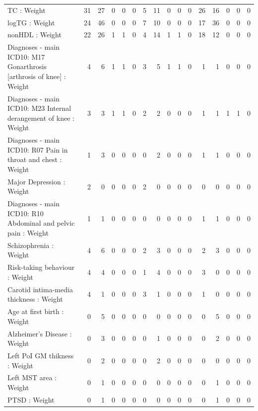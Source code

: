 \begin{table}[ht]
\begin{tabular}{lrrrrrrrrrrrrrrr}
  TC : Weight  &  31 &  27 &   0 &   0 &   0 &   5 &  11 &   0 &   0 &   0 &  26 &  16 &   0 &   0 &   0 \\ 
  logTG : Weight  &  24 &  46 &   0 &   0 &   0 &   7 &  10 &   0 &   0 &   0 &  17 &  36 &   0 &   0 &   0 \\ 
  nonHDL : Weight  &  22 &  26 &   1 &   1 &   0 &   4 &  14 &   1 &   1 &   0 &  18 &  12 &   0 &   0 &   0 \\ 
  Diagnoses - main ICD10: M17 Gonarthrosis [arthrosis of knee] : Weight  &   4 &   6 &   1 &   1 &   0 &   3 &   5 &   1 &   1 &   0 &   1 &   1 &   0 &   0 &   0 \\ 
  Diagnoses - main ICD10: M23 Internal derangement of knee : Weight  &   3 &   3 &   1 &   1 &   0 &   2 &   2 &   0 &   0 &   0 &   1 &   1 &   1 &   1 &   0 \\ 
  Diagnoses - main ICD10: R07 Pain in throat and chest : Weight  &   1 &   3 &   0 &   0 &   0 &   0 &   2 &   0 &   0 &   0 &   1 &   1 &   0 &   0 &   0 \\ 
  Major Depression : Weight  &   2 &   0 &   0 &   0 &   0 &   2 &   0 &   0 &   0 &   0 &   0 &   0 &   0 &   0 &   0 \\ 
  Diagnoses - main ICD10: R10 Abdominal and pelvic pain : Weight  &   1 &   1 &   0 &   0 &   0 &   0 &   0 &   0 &   0 &   0 &   1 &   1 &   0 &   0 &   0 \\ 
  Schizophrenia : Weight  &   4 &   6 &   0 &   0 &   0 &   2 &   3 &   0 &   0 &   0 &   2 &   3 &   0 &   0 &   0 \\ 
  Risk-taking behaviour : Weight  &   4 &   4 &   0 &   0 &   0 &   1 &   4 &   0 &   0 &   0 &   3 &   0 &   0 &   0 &   0 \\ 
  Carotid intima-media thickness : Weight  &   4 &   1 &   0 &   0 &   0 &   3 &   1 &   0 &   0 &   0 &   1 &   0 &   0 &   0 &   0 \\ 
  Age at first birth  : Weight  &   0 &   5 &   0 &   0 &   0 &   0 &   0 &   0 &   0 &   0 &   0 &   5 &   0 &   0 &   0 \\ 
  Alzheimer's Disease : Weight  &   0 &   3 &   0 &   0 &   0 &   0 &   1 &   0 &   0 &   0 &   0 &   2 &   0 &   0 &   0 \\ 
  Left PoI GM thikness : Weight  &   0 &   2 &   0 &   0 &   0 &   0 &   2 &   0 &   0 &   0 &   0 &   0 &   0 &   0 &   0 \\ 
  Left MST area : Weight  &   0 &   1 &   0 &   0 &   0 &   0 &   0 &   0 &   0 &   0 &   0 &   1 &   0 &   0 &   0 \\ 
  PTSD : Weight  &   0 &   1 &   0 &   0 &   0 &   0 &   0 &   0 &   0 &   0 &   0 &   1 &   0 &   0 &   0 \\ 

\end{tabular}
\end{table}

